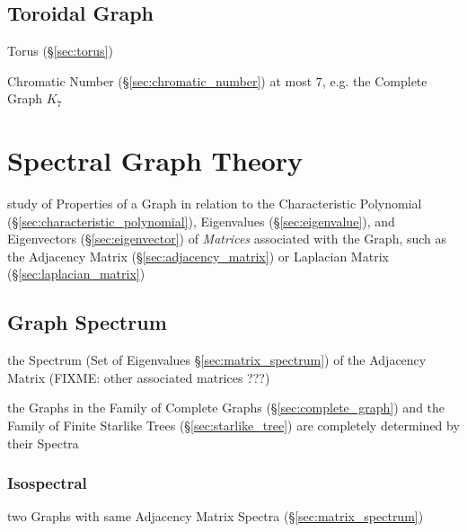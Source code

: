 \subsection{Toroidal Graph}\label{sec:toroidal_graph}

Torus (\S\ref{sec:torus})

Chromatic Number (\S\ref{sec:chromatic_number}) at most $7$, e.g. the Complete
Graph $K_7$



\section{Spectral Graph Theory}\label{sec:spectral_graph_theory}

study of Properties of a Graph in relation to the Characteristic Polynomial
(\S\ref{sec:characteristic_polynomial}), Eigenvalues (\S\ref{sec:eigenvalue}),
and Eigenvectors (\S\ref{sec:eigenvector}) of \emph{Matrices} associated with
the Graph, such as the Adjacency Matrix (\S\ref{sec:adjacency_matrix}) or
Laplacian Matrix (\S\ref{sec:laplacian_matrix})



\subsection{Graph Spectrum}\label{sec:graph_spectrum}

the Spectrum (Set of Eigenvalues \S\ref{sec:matrix_spectrum}) of the Adjacency
Matrix (FIXME: other associated matrices ???)

the Graphs in the Family of Complete Graphs (\S\ref{sec:complete_graph}) and
the Family of Finite Starlike Trees (\S\ref{sec:starlike_tree}) are completely
determined by their Spectra



\subsubsection{Isospectral}\label{sec:isospectrum}

two Graphs with same Adjacency Matrix Spectra (\S\ref{sec:matrix_spectrum})



